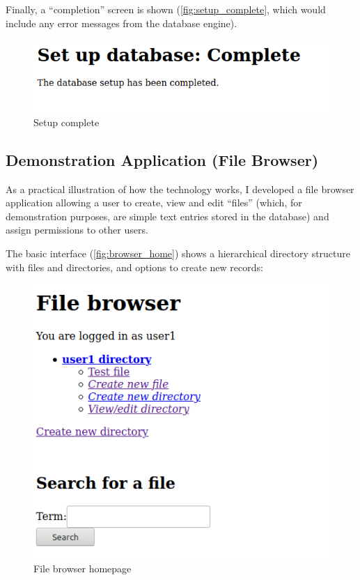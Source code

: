 \documentclass[12pt]{report}
\begin{document}
Finally, a ``completion'' screen is shown (\autoref{fig:setup_complete}, which would include any error messages from the database engine).

\begin{figure}[h]
  \begin{center}
    \includegraphics[scale=0.5]{04-setup3.png}
  \end{center}
  \caption{Setup complete}
  \label{fig:setup_complete}
\end{figure}

\subsection{Demonstration Application (File Browser)}
As a practical illustration of how the technology works, I developed a file browser application allowing a user to create, view and edit ``files'' (which, for demonstration purposes, are simple text entries stored in the database) and assign permissions to other users.

The basic interface (\autoref{fig:browser_home}) shows a hierarchical directory structure with files and directories, and options to create new records:

\begin{figure}[h]
  \begin{center}
    \includegraphics[scale=0.5]{05-browser1.png}
  \end{center}
  \caption{File browser homepage}
  \label{fig:browser_home}
\end{figure}
\end{document}
